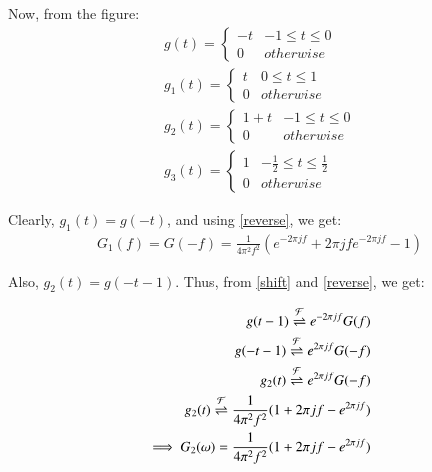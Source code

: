 \documentclass[journal,12pt,twocolumn]{IEEEtran}
\begin{document}
Now, from the figure:
\begin{align}
    g(t) = 
    \begin{cases}
    -t & -1 \leq t \leq 0\\
    0 & otherwise
    \end{cases}\\
    g_1(t) = 
    \begin{cases}
    t & 0 \leq t \leq 1\\
    0 & otherwise
    \end{cases}\\
    g_2(t) = 
    \begin{cases}
    1+t & -1 \leq t \leq 0\\
    0 & otherwise
    \end{cases}\\
    g_3(t) = 
    \begin{cases}
    1 & -\frac{1}{2} \leq t \leq \frac{1}{2}\\
    0 & otherwise
    \end{cases}
\end{align}



Clearly, $g_1(t) = g(-t)$, and using \eqref{reverse}, we get:
\begin{align}
    G_1(f) = G(-f) = \frac{1}{4\pi^2f^2}(e^{-2\pi jf} + 2\pi jf e^{-2\pi jf} - 1)
\end{align}


Also, $g_2(t) = g(-t-1)$. Thus, from \eqref{shift} and \eqref{reverse}, we get:

\begin{align}
    g(t-1) \overset{\mathcal{F}}{ \rightleftharpoons} e^{-2\pi jf}G(f)\\
    g(-t-1) \overset{\mathcal{F}}{ \rightleftharpoons} e^{2\pi jf} G(-f)\\
    g_2(t) \overset{\mathcal{F}}{ \rightleftharpoons} e^{2\pi jf}G(-f) \\
   g_2(t) \overset{\mathcal{F}}{ \rightleftharpoons} \frac{1}{4\pi^2f^2}(1 + 2\pi jf  - e^{2\pi jf})\\
   \implies G_2(\omega) =  \frac{1}{4\pi^2f^2}(1 + 2\pi jf  - e^{2\pi jf})
\end{align}
\end{document}
